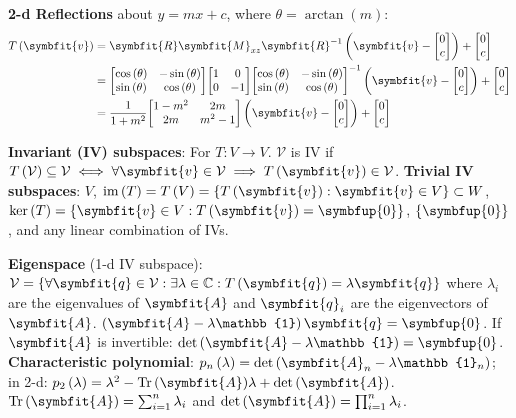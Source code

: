 \documentclass{article}
\begin{document}
\noindent \textbf{2-d Reflections} about $y=mx + c$, where $\theta=\arctan{\left( m \right)}$:
\begin{align*}
	T\left( \symbfit{v} \right) &= \symbfit{R} \symbfit{M}_{xz} \symbfit{R}^{-1} \left( \symbfit{v} - \mqty[0 \\ c] \right) + \mqty[0 \\ c] \\
	&= \mqty[\cos{\left( \theta \right)} & -\sin{\left( \theta \right)} \\ \sin{\left( \theta \right)} & \cos{\left( \theta \right)}] \mqty[1 & 0 \\ 0 & -1] \mqty[\cos{\left( \theta \right)} & -\sin{\left( \theta \right)} \\ \sin{\left( \theta \right)} & \cos{\left( \theta \right)}]^{-1} \left( \symbfit{v} - \mqty[0 \\ c] \right) + \mqty[0 \\ c] \\
	&= \frac{1}{1+m^2}\mqty[1-m^2 & 2m \\ 2m & m^2-1] \left( \symbfit{v} - \mqty[0 \\ c] \right) + \mqty[0 \\ c]
\end{align*}

\noindent \textbf{Invariant (IV) subspaces}: For $T:V\rightarrow V$. $\mathcal{V}$ is IV if $\func{T}{\mathcal{V}}\subseteq \mathcal{V}\iff\forall \symbfit{v}\in \mathcal{V}\implies \func{T}{\symbfit{v}}\in \mathcal{V}$. \textbf{Trivial IV subspaces}: $V$, $\vim{\left( T \right)} = \func{T}{V} = \left\{ \func{T}{\symbfit{v}} : \symbfit{v}\in V \right\} \subset W$, $\vker{\left( T \right)} = \left\{ \symbfit{v}\in V : \func{T}{\symbfit{v}}=\symbfup{0} \right\}$, $\left\{ \symbfup{0} \right\}$, and any linear combination of IVs.

\noindent \textbf{Eigenspace} (1-d IV subspace): $\mathcal{V} = \left\{ \forall \symbfit{q}\in \mathcal{V}:\exists \lambda \in \mathbb{C}:\func{T}{\symbfit{q}}=\lambda \symbfit{q} \right\}$ where $\lambda_i$ are the eigenvalues of $\symbfit{A}$ and $\symbfit{q}_i$ are the eigenvectors of $\symbfit{A}$. $\left( \symbfit{A} - \lambda \mathbb{1} \right) \symbfit{q}=\symbfup{0}$. If $\symbfit{A}$ is invertible: $\det{\left( \symbfit{A} - \lambda\mathbb{1} \right)}=\symbfup{0}$. \textbf{Characteristic polynomial}: $\func{p_n}{\lambda} = \det{\left( \symbfit{A}_n - \lambda\mathbb{1}_n \right)}$; in 2-d: $\func{p_2}{\lambda}=\lambda^2-\tr{\left( \symbfit{A} \right)}\lambda + \det{\left( \symbfit{A} \right)}$. $\tr{\left( \symbfit{A} \right)} = \sum_{i=1}^n \lambda_i$ and $\det{\left( \symbfit{A} \right)} = \prod_{i=1}^n \lambda_i$. 
\end{document}

